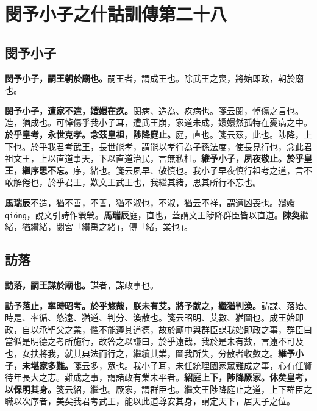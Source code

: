 \chapter{閔予小子之什詁訓傳第二十八}

\section{閔予小子}


\textbf{閔予小子，嗣王朝於廟也。}{\footnotesize 嗣王者，謂成王也。除武王之喪，將始即政，朝於廟也。}

\textbf{閔予小子，遭家不造，嬛嬛在疚。}{\footnotesize 閔病、造為、疚病也。箋云閔，悼傷之言也。造，猶成也。可悼傷乎我小子耳，遭武王崩，家道未成，嬛嬛然孤特在憂病之中。}\textbf{於乎皇考，永世克孝。念茲皇祖，陟降庭止。}{\footnotesize 庭，直也。箋云茲，此也。陟降，上下也。於乎我君考武王，長世能孝，謂能以孝行為子孫法度，使長見行也，念此君祖文王，上以直道事天，下以直道治民，言無私枉。}\textbf{維予小子，夙夜敬止。於乎皇王，繼序思不忘。}{\footnotesize 序，緒也。箋云夙早、敬慎也。我小子早夜慎行祖考之道，言不敢解倦也，於乎君王，歎文王武王也，我繼其緒，思其所行不忘也。}

\begin{quoting}\textbf{馬瑞辰}不造，猶不善，不善，猶不淑也，不淑，猶云不祥，謂遭凶喪也。嬛嬛 \texttt{qióng}，說文引詩作煢煢。\textbf{馬瑞辰}庭，直也，蓋謂文王陟降群臣皆以直道。\textbf{陳奐}繼緒，猶纘緒，閟宮「纘禹之緒」，傳「緒，業也」。\end{quoting}

\section{訪落}


\textbf{訪落，嗣王謀於廟也。}{\footnotesize 謀者，謀政事也。}

\textbf{訪予落止，率時昭考。於乎悠哉，朕未有艾。將予就之，繼猶判渙。}{\footnotesize 訪謀、落始、時是、率循、悠遠、猶道、判分、渙散也。箋云昭明、艾數、猶圖也。成王始即政，自以承聖父之業，懼不能遵其道德，故於廟中與群臣謀我始即政之事，群臣曰當循是明德之考所施行，故答之以謙曰，於乎遠哉，我於是未有數，言遠不可及也，女扶將我，就其典法而行之，繼續其業，圖我所失，分散者收斂之。}\textbf{維予小子，未堪家多難。}{\footnotesize 箋云多，眾也。我小子耳，未任統理國家眾難成之事，心有任賢待年長大之志。難成之事，謂諸政有業未平者。}\textbf{紹庭上下，陟降厥家。休矣皇考，以保明其身。}{\footnotesize 箋云紹，繼也。厥家，謂群臣也。繼文王陟降庭止之道，上下群臣之職以次序者，美矣我君考武王，能以此道尊安其身，謂定天下，居天子之位。}

